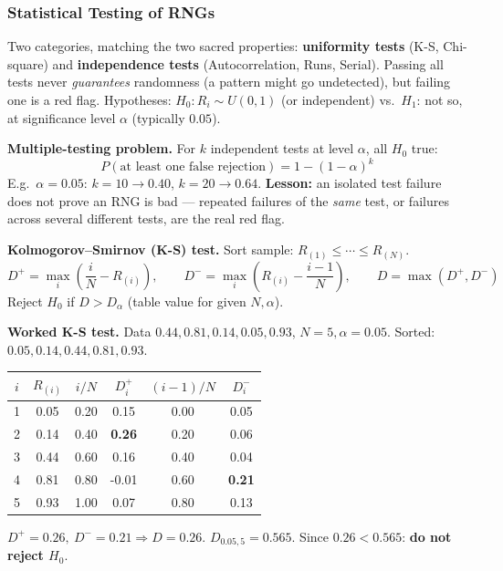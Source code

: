 \subsubsection{Statistical Testing of RNGs}

\begin{defbox}
Two categories, matching the two sacred properties: \textbf{uniformity tests} (K-S, Chi-square) and \textbf{independence tests} (Autocorrelation, Runs, Serial). Passing all tests never \emph{guarantees} randomness (a pattern might go undetected), but failing one is a red flag. Hypotheses: $H_0:R_i\sim U(0,1)$ (or independent) vs.\ $H_1$: not so, at significance level $\alpha$ (typically $0.05$).
\end{defbox}

\textbf{Multiple-testing problem.} For $k$ independent tests at level $\alpha$, all $H_0$ true:
\[
P(\text{at least one false rejection}) = 1-(1-\alpha)^k
\]
E.g.\ $\alpha=0.05$: $k=10\to0.40$, $k=20\to0.64$. \textbf{Lesson:} an isolated test failure does not prove an RNG is bad — repeated failures of the \emph{same} test, or failures across several different tests, are the real red flag.

\textbf{Kolmogorov--Smirnov (K-S) test.} Sort sample: $R_{(1)}\le\cdots\le R_{(N)}$.
\[
D^+ = \max_i\left(\frac{i}{N}-R_{(i)}\right), \qquad D^- = \max_i\left(R_{(i)}-\frac{i-1}{N}\right), \qquad D=\max(D^+,D^-)
\]
Reject $H_0$ if $D>D_\alpha$ (table value for given $N,\alpha$).

\begin{examplebox}
\textbf{Worked K-S test.} Data $0.44,0.81,0.14,0.05,0.93$, $N=5,\alpha=0.05$. Sorted: $0.05,0.14,0.44,0.81,0.93$.
\begin{center}\small
\begin{tabular}{@{}cccccc@{}}
\toprule
$i$ & $R_{(i)}$ & $i/N$ & $D_i^+$ & $(i{-}1)/N$ & $D_i^-$\\
\midrule
1&0.05&0.20&0.15&0.00&0.05\\
2&0.14&0.40&\textbf{0.26}&0.20&0.06\\
3&0.44&0.60&0.16&0.40&0.04\\
4&0.81&0.80&-0.01&0.60&\textbf{0.21}\\
5&0.93&1.00&0.07&0.80&0.13\\
\bottomrule
\end{tabular}
\end{center}
$D^+=0.26,\ D^-=0.21\Rightarrow D=0.26$. $D_{0.05,5}=0.565$. Since $0.26<0.565$: \textbf{do not reject $H_0$}.
\end{examplebox}

